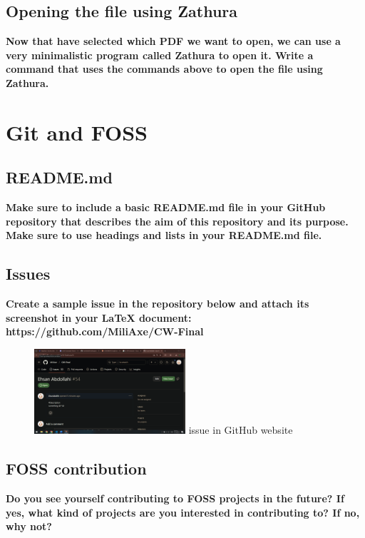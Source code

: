 \documentclass{article}
\begin{document}
\subsection{Opening the file using Zathura}
\textbf{Now that have selected which PDF we want to open, we can use a very minimalistic program called Zathura to open it. Write a command that uses the commands above to open the file using Zathura.}

\section{Git and FOSS}
\subsection{README.md}
\textbf{Make sure to include a basic README.md file in your GitHub repository that describes the aim of this repository and its purpose. 
Make sure to use headings and lists in your README.md file.}
\textcolor{green}{}
\subsection{Issues}
\textbf{Create a sample issue in the repository below and attach its screenshot in your LaTeX document: https://github.com/MiliAxe/CW-Final}
\begin{figure}[h]
    \centering
    \includegraphics[width=0.5\textwidth]{Screenshot.png}
    \my issue in GitHub website
\end{figure}
\textcolor{green}{}
\subsection{FOSS contribution}
\textbf{Do you see yourself contributing to FOSS projects in the future? If yes, what kind of projects are you interested in contributing to? If no, why not?}
\end{document}
